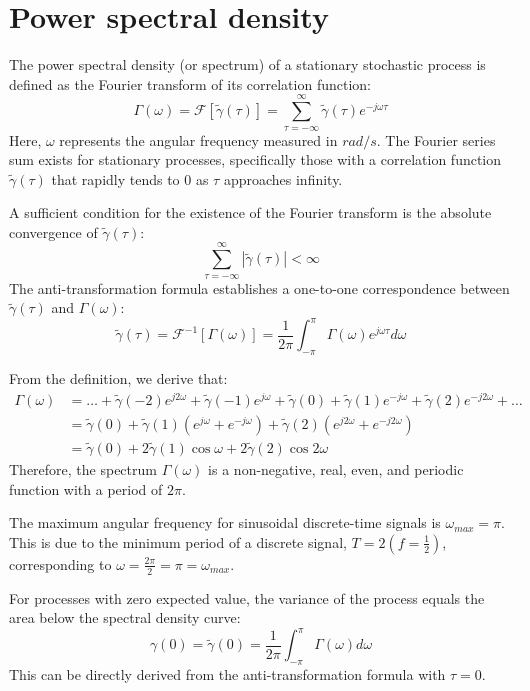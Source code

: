 \section{Power spectral density}

The power spectral density (or spectrum) of a stationary stochastic process is defined as the Fourier transform of its correlation function:
\[\Gamma (\omega)=\mathcal{F} \left[ \tilde{\gamma}(\tau) \right]=\sum_{\tau = -\infty}^{\infty}\tilde{\gamma}(\tau)e^{-j\omega\tau}\]
Here, $\omega$ represents the angular frequency measured in $rad/s$. 
The Fourier series sum exists for stationary processes, specifically those with a correlation function $\tilde{\gamma}(\tau)$ that rapidly tends to 0 as $\tau$ approaches infinity.

A sufficient condition for the existence of the Fourier transform is the absolute convergence of $\tilde{\gamma}(\tau)$:
\[\sum_{\tau=-\infty}^{\infty}\left\lvert \tilde{\gamma}(\tau) \right\rvert < \infty\]
The anti-transformation formula establishes a one-to-one correspondence between $\tilde{\gamma}(\tau)$ and $\Gamma (\omega)$: 
\[\tilde{\gamma}(\tau)=\mathcal{F}^{-1}\left[ \Gamma (\omega) \right]=\dfrac{1}{2\pi}\int_{-\pi}^{\pi}\Gamma(\omega)e^{j\omega\tau}d\omega\]

From the definition, we derive that:
\begin{align*}
    \Gamma(\omega)  &=\dots+\tilde{\gamma}(-2)e^{j2\omega}+\tilde{\gamma}(-1)e^{j\omega}+\tilde{\gamma}(0)+\tilde{\gamma}(1)e^{-j\omega}+\tilde{\gamma}(2)e^{-j2\omega}+\dots \\
                    &=\tilde{\gamma}(0)+\tilde{\gamma}(1)(e^{j\omega}+e^{-j\omega})+\tilde{\gamma}(2)(e^{j2\omega}+e^{-j2\omega}) \\
                    &=\tilde{\gamma}(0)+2\tilde{\gamma}(1)\cos\omega+2\tilde{\gamma}(2)\cos2\omega 
\end{align*}
Therefore, the spectrum $\Gamma(\omega)$ is a non-negative, real, even, and periodic function with a period of $2\pi$. 

The maximum angular frequency for sinusoidal discrete-time signals is $\omega_{max} = \pi$.
This is due to the minimum period of a discrete signal, $T = 2 \left(f = \frac{1}{2}\right)$, corresponding to $\omega = \frac{2\pi}{2} = \pi = \omega_{max}$.

For processes with zero expected value, the variance of the process equals the area below the spectral density curve:
\[\gamma(0)=\tilde{\gamma}(0)=\dfrac{1}{2\pi}\int_{-\pi}^{\pi}\Gamma(\omega)d\omega\]
This can be directly derived from the anti-transformation formula with $\tau = 0$.

